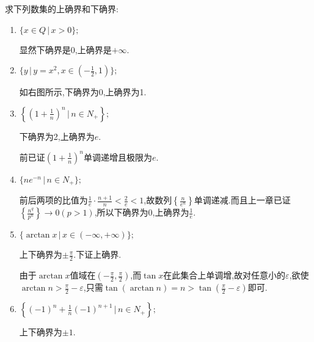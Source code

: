      \begin{exercise}
         求下列数集的上确界和下确界:
         \begin{enumerate}
             \item $\{x\in Q\,\lvert\, x>0\};$
                   \begin{solution}
                       显然下确界是0,上确界是$+\infty$.
                   \end{solution}
             \item $\{y\,\lvert\, y=x^2,x\in(-\frac{1}{2},1)\};$
                   \begin{solution}
                       如右图所示,下确界为0,上确界为1.
                   \end{solution}
             \item $\left\{\left(1+\frac{1}{n}\right)^n \,\bigg\lvert\, n\in N_+\right\};$
                   \begin{solution}
                       下确界为2,上确界为$e$.

                       前已证$\left(1+\frac{1}{n}\right)^n$单调递增且极限为$e$.
                   \end{solution}
             \item $\{ne^{-n}\,\lvert\, n\in N_+\};$
                   \begin{solution}
                       前后两项的比值为$\frac{1}{e}\cdot\frac{n+1}{n}<\frac{2}{e}<1$,故数列$\left\{\frac{n}{e^n}\right\}$单调递减.而且上一章已证$\left\{\frac{n^q}{p^n}\right\}\to 0(p>1)$,所以下确界为0,上确界为$\frac{1}{e}$.
                   \end{solution}
             \item $\{\arctan x \,\lvert\, x\in (-\infty,+\infty)\};$
                   \begin{solution}
                       上下确界为$\pm \frac{\pi}{2}$.下证上确界.

                       由于$\arctan x$值域在$\left(-\frac{\pi}{2},\frac{\pi}{2}\right)$,而$\tan x$在此集合上单调增,故对任意小的$\varepsilon$,欲使$\arctan n>\frac{\pi}{2}-\varepsilon$,只需$\tan(\arctan n)=n>\tan\left(\frac{\pi}{2}-\varepsilon\right)$即可.

                   \end{solution}
             \item $\left\{(-1)^n+\frac{1}{n}(-1)^{n+1}\,\biggl\lvert\, n\in N_+\right\};$
                   \begin{solution}
                       上下确界为$\pm 1$.


\end{solution}
\end{enumerate}
\end{exercise}
